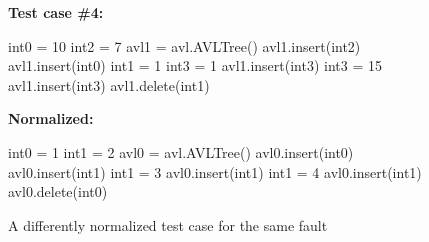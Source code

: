 \begin{figure}
{\scriptsize
{\bf Test case \#4:}
\begin{code}
int0 = 10 
int2 = 7 
avl1 = avl.AVLTree() 
avl1.insert(int2) 
avl1.insert(int0) 
int1 = 1 
int3 = 1 
avl1.insert(int3) 
int3 = 15 
avl1.insert(int3) 
avl1.delete(int1) 
\end{code}
{\bf Normalized:}
\begin{code}
int0 = 1
int1 = 2
avl0 = avl.AVLTree()
avl0.insert(int0) 
avl0.insert(int1) 
int1 = 3  
avl0.insert(int1) 
int1 = 4  
avl0.insert(int1)  
avl0.delete(int0) 
\end{code}
}
\caption{A differently normalized test case for the same fault}
\label{diffnorm}
\end{figure}